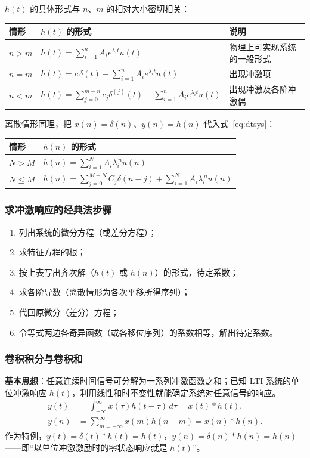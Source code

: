 $h(t)$ 的具体形式与 $n$、$m$ 的相对大小密切相关：
\begin{center}
\begin{tabular}{lll}
\toprule
情形 & $h(t)$ 的形式 & 说明 \\
\midrule
$n>m$ & $h(t)=\displaystyle\sum_{i=1}^{n}A_i e^{\lambda_i t}u(t)$ & 物理上可实现系统的一般形式 \\
$n=m$ & $h(t)=c\,\delta(t)+\displaystyle\sum_{i=1}^{n}A_i e^{\lambda_i t}u(t)$ & 出现冲激项 \\
$n<m$ & $h(t)=\displaystyle\sum_{j=0}^{m-n}c_j\delta^{(j)}(t)+\sum_{i=1}^{n}A_i e^{\lambda_i t}u(t)$ & 出现冲激及各阶冲激偶 \\
\bottomrule
\end{tabular}
\end{center}

离散情形同理，把 $x(n)=\delta(n)$、$y(n)=h(n)$ 代入式~\eqref{eq:dtsys}：
\begin{center}
\begin{tabular}{ll}
\toprule
情形 & $h(n)$ 的形式 \\
\midrule
$N>M$ & $h(n)=\displaystyle\sum_{i=1}^{N}A_i\lambda_i^{\,n}u(n)$ \\
$N\le M$ & $h(n)=\displaystyle\sum_{j=0}^{M-N}C_j\delta(n-j)+\sum_{i=1}^{N}A_i\lambda_i^{\,n}u(n)$ \\
\bottomrule
\end{tabular}
\end{center}

\subsubsection{求冲激响应的经典法步骤}
\begin{enumerate}
\item 列出系统的微分方程（或差分方程）；
\item 求特征方程的根；
\item 按上表写出齐次解（$h(t)$ 或 $h(n)$）的形式，待定系数；
\item 求各阶导数（离散情形为各次平移所得序列）；
\item 代回原微分（差分）方程；
\item 令等式两边各奇异函数（或各移位序列）的系数相等，解出待定系数。
\end{enumerate}

\subsubsection{卷积积分与卷积和}
\textbf{基本思想}：任意连续时间信号可分解为一系列冲激函数之和；已知 LTI 系统的单位冲激响应 $h(t)$，利用线性和时不变性就能确定系统对任意信号的响应。
\begin{align}
y(t)&=\int_{-\infty}^{\infty}x(\tau)h(t-\tau)\,d\tau=x(t)*h(t), \label{eq:conv}\\
y(n)&=\sum_{m=-\infty}^{\infty}x(m)h(n-m)=x(n)*h(n). \label{eq:convsum}
\end{align}
作为特例，$y(t)=\delta(t)*h(t)=h(t)$，$y(n)=\delta(n)*h(n)=h(n)$——即“以单位冲激激励时的零状态响应就是 $h(t)$”。

